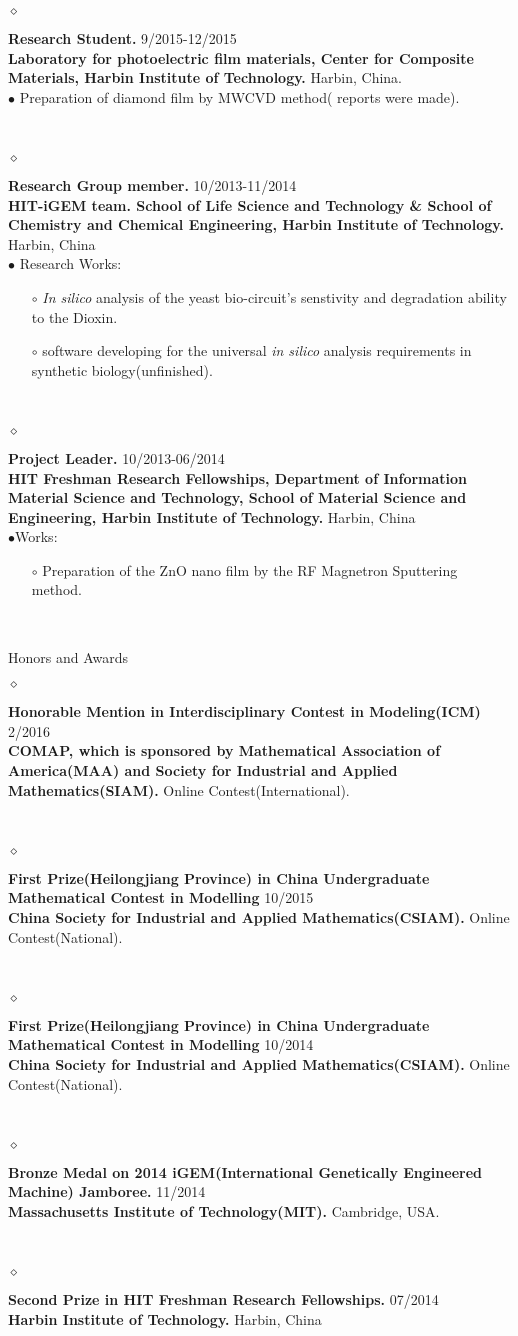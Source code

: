 \documentclass[a4paper]{article}
\makeatletter
\renewcommand{\section}{\@startsection  
{section}  
{12}  
{\z@}  
{0.2\baselineskip}  
{0.1\baselineskip}  
{\normalfont\large\scshape\bfseries}}
\newcommand{\dline} {\vspace{-0.3cm}
\noindent\hrulefill 

}
\newcommand{\entry}[5]
{
	\noindent
	$\diamond$ \parbox[t]{\textwidth}
	{
		 \textbf{{#2}} \small
		 \hfill #1
		 \\ \textbf{#3} \hfill {#4}
	\\#5
	}\\ \normalsize  
}
\newcommand{\entrys}[4]
{
	\noindent
	$\diamond$ \parbox[t]{\textwidth}
	{
		 \textbf{{#2}} \small
		 \hfill #1
		 \\ \textbf{#3} \hfill {#4}
	}\\ \normalsize  
}
\makeatother
\begin{document}
\entry
{9/2015-12/2015}
{Research Student.}
{Laboratory for photoelectric film materials, Center for Composite Materials, Harbin Institute of Technology.}
{Harbin, China.}
{$\bullet$ Preparation of diamond film by MWCVD method( reports were made).}
\entry
{10/2013-11/2014}
{Research Group member.}
{HIT-iGEM team. School of Life Science and Technology \& School of Chemistry and Chemical Engineering, Harbin Institute of Technology.}
{Harbin, China}
{$\bullet$ Research Works: 
\begin{itemize}
\item[$\circ$]\emph{In silico} analysis of the yeast bio-circuit's senstivity and degradation ability to the Dioxin.
\item[$\circ$]software developing for the universal \emph{in silico} analysis requirements in synthetic biology(unfinished).
\end{itemize}  
}

\entry
 {10/2013-06/2014}
 {Project Leader.}
 {HIT Freshman Research Fellowships, Department of Information Material Science and Technology, School of Material Science and Engineering, Harbin  Institute of Technology.}
 {Harbin, China}
 {$\bullet$Works: 
 \begin{itemize}
 \item[$\circ$]Preparation of the ZnO nano film by the RF Magnetron Sputtering method.
 \end{itemize}
 
 }
\section{Honors and Awards}
\dline
\entrys
{2/2016}
{Honorable Mention in Interdisciplinary Contest in Modeling(ICM)}
{COMAP, which is sponsored by Mathematical Association of America(MAA) and Society for Industrial and Applied Mathematics(SIAM).}
{Online Contest(International).}
\entrys
{10/2015}
{First Prize(Heilongjiang Province) in China Undergraduate Mathematical Contest in Modelling}
{China Society for Industrial and Applied Mathematics(CSIAM).}
{Online Contest(National).}
\entrys
{10/2014}
{First Prize(Heilongjiang Province) in China Undergraduate Mathematical Contest in Modelling}
{ China Society for Industrial and Applied Mathematics(CSIAM).}
{Online Contest(National).}
\entrys
{11/2014}
{Bronze Medal on 2014 iGEM(International Genetically Engineered Machine) Jamboree.}
{Massachusetts Institute of Technology(MIT).}
{Cambridge, USA.}
\entrys
{07/2014}
{Second Prize in HIT Freshman Research Fellowships.}
{Harbin Institute of Technology.}
{Harbin, China}
\end{document}
